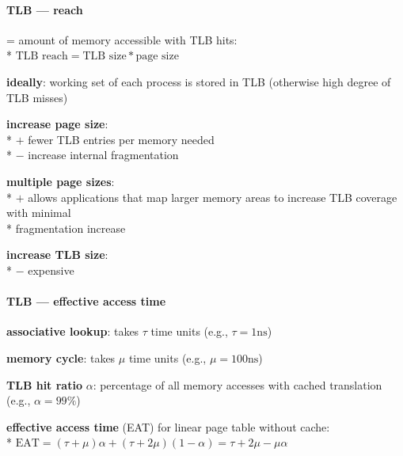 \paragraph{TLB --- reach}
\begin{items}
  \item = amount of memory accessible with TLB hits: \\*
    $ \text{TLB reach} = \text{TLB size} * \text{page size} $
  \item \textbf{ideally}: working set of each process is stored in TLB (otherwise high degree of TLB misses)
  \item \textbf{increase page size}: \\*
    $ + $ fewer TLB entries per memory needed \\*
    $ - $ increase internal fragmentation
  \item \textbf{multiple page sizes}: \\*
    $ + $ allows applications that map larger memory areas to increase TLB coverage with minimal \\* \phantom{$ + $} fragmentation increase
  \item \textbf{increase TLB size}: \\*
    $ - $ expensive
\end{items}

\paragraph{TLB --- effective access time}
\begin{items}
  \item \textbf{associative lookup}: takes $ \tau $ time units (e.g., $ \tau = 1\text{ns} $)
  \item \textbf{memory cycle}: takes $ \mu $ time units (e.g., $ \mu = 100\text{ns} $)
  \item \textbf{TLB hit ratio} $ \alpha $: percentage of all memory accesses with cached translation (e.g., $ \alpha = 99\% $)
  \item \textbf{effective access time} (EAT) for linear page table without cache: \\*
    $ \text{EAT} = (\tau + \mu)\alpha + (\tau + 2\mu)(1-\alpha) = \tau + 2\mu - \mu\alpha $
\end{items}

